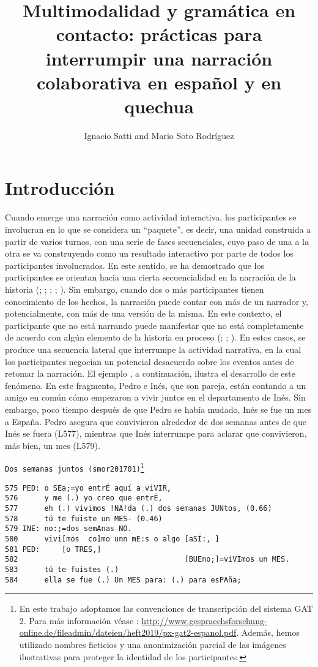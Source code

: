 \documentclass[output=paper]{../langscibook}
\title{Multimodalidad y gramática en contacto: prácticas para interrumpir una narración colaborativa en español y en quechua}
\author{Ignacio Satti\orcid{0000-0002-9191-3627}\affiliation{Albert-Ludwigs-Universität Freiburg} and Mario Soto Rodríguez\orcid{0000-0002-6535-1392}\affiliation{Albert-Ludwigs-Universität Freiburg}}
\begin{document}
\maketitle

\section{Introducción}
Cuando emerge una narración como actividad interactiva, los participantes se involucran en lo que se considera un “paquete”, es decir, una unidad construida a partir de varios turnos, con una serie de fases secuenciales, cuyo paso de una a la otra se va construyendo como un resultado interactivo por parte de todos los participantes involucrados. En este sentido, se ha demostrado que los participantes se orientan hacia una cierta secuencialidad en la narración de la historia (\citealt{Labov1972book}; \citealt{Jefferson1988}; \citealt{Lerner1992}; \citealt{Stivers2008}; \citealt{Couper-KuhlenSelting2017}). Sin embargo, cuando dos o más participantes tienen conocimiento de los hechos, la narración puede contar con más de un narrador y, potencialmente, con más de una versión de la misma. En este contexto, el participante que no está narrando puede manifestar que no está completamente de acuerdo con algún elemento de la historia en proceso (\citealt{Quasthoff1980}; \citealt{Lerner1992}; \citealt{Sacks1995}). En estos casos, se produce una secuencia lateral \citep{Jefferson1972} que interrumpe la actividad narrativa, en la cual los participantes negocian un potencial desacuerdo sobre los eventos antes de retomar la narración. El ejemplo , a continuación, ilustra el desarrollo de este fenómeno. En este fragmento, Pedro e Inés, que son pareja, están contando a un amigo en común cómo empezaron a vivir juntos en el departamento de Inés.  Sin embargo, poco tiempo después de que Pedro se había mudado, Inés se fue un mes a España. Pedro asegura que convivieron alrededor de dos semanas antes de que Inés se fuera (L577), mientras que Inés interrumpe para aclarar que convivieron, más bien, un mes (L579).

\ea\label{ex:satti:1}
\texttt{Dos semanas juntos (smor201701)}\footnote{En este trabajo adoptamos las convenciones de transcripción del sistema GAT 2. Para más información véase \citet{EhmerEtAl2019}: \url{http://www.gespraechsforschung-online.de/fileadmin/dateien/heft2019/px-gat2-espanol.pdf}. Además, hemos utilizado nombres ficticios y una anonimización parcial de las imágenes ilustrativas para proteger la identidad de los participantes.}
\begin{verbatim}
575 PED: o SEa;=yo entrÉ aquí a viVIR,
576      y me (.) yo creo que entrÉ, 
577      eh (.) vivimos !NA!da (.) dos semanas JUNtos, (0.66)           
578      tú te fuiste un MES- (0.46)     
579 INE: no:;=dos semAnas NO.
580      vivi[mos  co]mo unn mE:s o algo [aSÍ:, ] 
581 PED:     [o TRES,]
582                                      [BUEno;]=viVImos un MES.
583      tú te fuistes (.)
584      ella se fue (.) Un MES para: (.) para esPAña;
\end{verbatim}
\z
\end{document}
